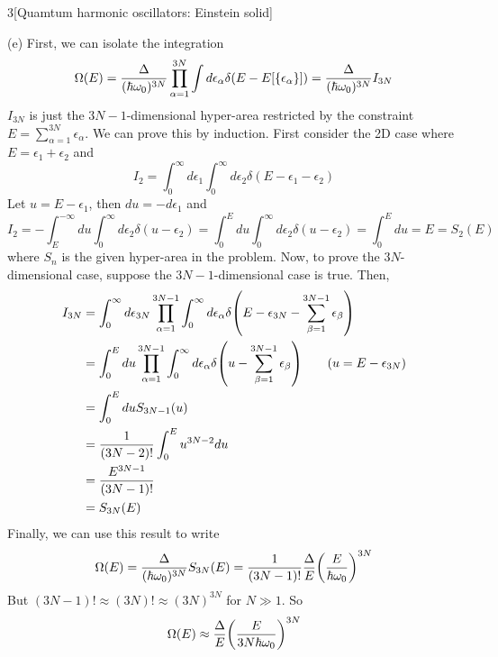 \documentclass[12pt]{article}
\begin{document}
\begin{problem}{3}[Quamtum harmonic oscillators: Einstein solid]
\begin{solution}
(e) First, we can isolate the integration
\begin{equation}
    \Omega(E)=\frac{\Delta}{(\hbar\omega_0)^{3N}}\prod_{\alpha=1}^{3N}
    \int d\epsilon_\alpha\delta(E-E[\qty{\epsilon_\alpha}])
    =\frac{\Delta}{(\hbar\omega_0)^{3N}}I_{3N}
\end{equation}
$I_{3N}$ is just the $3N-1$-dimensional hyper-area restricted by the 
constraint $E=\sum_{\alpha=1}^{3N}\epsilon_\alpha$. We can prove this by 
induction. First consider the 2D case where $E=\epsilon_1+\epsilon_2$ and
\begin{equation}
    I_{2}=\int_0^\infty d\epsilon_1\int_0^\infty
    d\epsilon_2\delta(E-\epsilon_1-\epsilon_2) 
\end{equation}
Let $u=E-\epsilon_1$, then $du=-d\epsilon_1$ and
\begin{equation}
    I_{2}=-\int_E^{-\infty}du\int_0^\infty d\epsilon_2\delta(u-\epsilon_2) 
    =\int_0^Edu\int_0^\infty d\epsilon_2\delta(u-\epsilon_2)=\int_0^Edu
    =E=S_2(E)
\end{equation}
where $S_n$ is the given hyper-area in the problem. Now, to prove the
$3N$-dimensional case, suppose the $3N-1$-dimensional case is true. Then,
\begin{align}
    I_{3N}
    &=\int_0^\infty d\epsilon_{3N}\prod_{\alpha=1}^{3N-1}\int_0^\infty
    d\epsilon_\alpha
    \delta\qty(E-\epsilon_{3N}-\sum_{\beta=1}^{3N-1}\epsilon_\beta)\notag\\
    &=\int_0^Edu\prod_{\alpha=1}^{3N-1}\int_0^\infty d\epsilon_\alpha\delta\qty(u-\sum_{\beta=1}^{3N-1}\epsilon_\beta)\tag{$u=E-\epsilon_{3N}$}\\
    &=\int_0^Edu S_{3N-1}(u)\notag\\
    &=\frac1{(3N-2)!}\int_0^E u^{3N-2} du\notag\\
    &=\frac{E^{3N-1}}{(3N-1)!}\notag\\
    &=S_{3N}(E)
\end{align}
Finally, we can use this result to write
\begin{equation}
    \Omega(E)=\frac{\Delta}{(\hbar\omega_0)^{3N}}S_{3N}(E) 
    =\frac1{(3N-1)!}\frac{\Delta}{E}\qty(\frac{E}{\hbar\omega_0})^{3N}
\end{equation}
But $(3N-1)!\approx(3N)!\approx (3N)^{3N}$ for $N\gg1$. So
\begin{equation}
    \Omega(E)\approx\frac{\Delta}{E}\qty(\frac{E}{3N\hbar\omega_0})^{3N} 
\end{equation}
\end{solution}
\end{problem}
\end{document}
